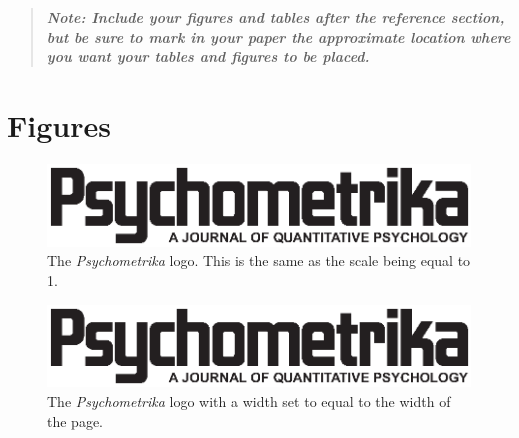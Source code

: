 \documentclass[titlepage,12pt]{article}
\begin{document}
\vspace{\fill}\begin{quote}\textbf{\textit{Note: Include your figures and tables after the reference section, but be sure to mark in your paper the approximate location where you want your tables and figures to be placed.}}\end{quote}\vspace{\fill}\pagebreak
{}
\flushbottom




\section*{Figures}

\vspace{\fill}

\begin{figure}[hp]
\begin{center}
\includegraphics{p-logo.eps}
\caption{The \textit{Psychometrika} logo. This is the same as the
scale being equal to 1.}
\end{center}
\end{figure}

\figskip

\begin{figure}[hp]
\begin{center}
\includegraphics[width={\textwidth}]{p-logo.eps}
\caption{The \textit{Psychometrika} logo with a width set to equal
to the width of the page.} \label{textwidth}
\end{center}
\end{figure}
\end{document}
